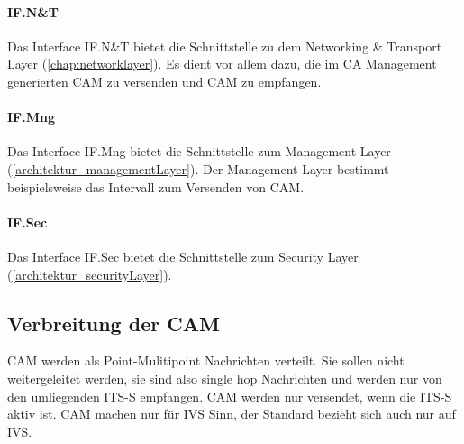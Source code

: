 \paragraph{IF.N\&T}
Das Interface IF.N\&T bietet die Schnittstelle zu dem Networking \& Transport Layer (\autoref{chap:networklayer}). Es dient vor allem dazu, die im \ac{CA} Management generierten \ac{CAM} zu versenden und \ac{CAM} zu empfangen. 

\paragraph{IF.Mng}
Das Interface IF.Mng bietet die Schnittstelle zum Management Layer (\ref{architektur_managementLayer}). Der Management Layer bestimmt beispielsweise das Intervall zum Versenden von \ac{CAM}.

\paragraph{IF.Sec}
Das Interface IF.Sec bietet die Schnittstelle zum Security Layer (\ref{architektur_securityLayer}).

\subsection{Verbreitung der CAM}
\ac{CAM} werden als Point-Mulitipoint Nachrichten verteilt. Sie sollen nicht weitergeleitet werden, sie sind also single hop Nachrichten und werden nur von den umliegenden \ac{ITS-S} empfangen. \ac{CAM} werden nur versendet, wenn die \ac{ITS-S} aktiv ist. \ac{CAM} machen nur für \ac{IVS} Sinn, der Standard \cite{en302637-2} bezieht sich auch nur auf \ac{IVS}. 

